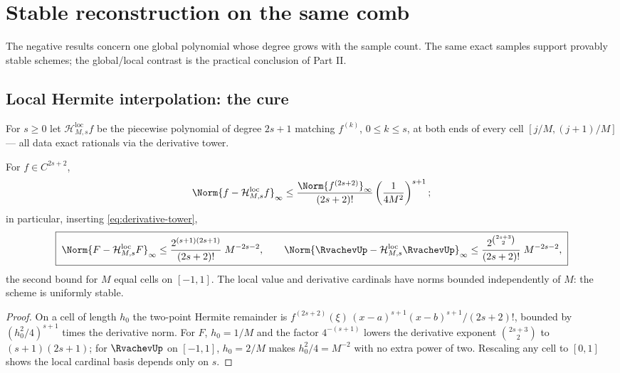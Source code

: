 \section{Stable reconstruction on the same comb}
\label{sec:alternatives}

The negative results concern one global polynomial whose degree grows
with the sample count.  The same exact samples support provably
stable schemes; the global/local contrast is the practical conclusion
of Part II.

\subsection{Local Hermite interpolation: the cure}

For $s\ge0$ let $\mathcal H^{\mathrm{loc}}_{M,s}f$ be the piecewise
polynomial of degree $2s+1$ matching $f^{(k)}$, $0\le k\le s$, at both
ends of every cell $[j/M,(j+1)/M]$ --- all data exact rationals via
the derivative tower.

\begin{theorem}
\label{thm:local-error}
For $f\in C^{2s+2}$,
\begin{equation}
 \Norm{f-\mathcal H^{\mathrm{loc}}_{M,s}f}_\infty
 \le\frac{\Norm{f^{(2s+2)}}_\infty}{(2s+2)!}
 \left(\frac{1}{4M^{2}}\right)^{s+1};
 \label{eq:local-general}
\end{equation}
in particular, inserting \eqref{eq:derivative-tower},
\begin{equation}
 \boxed{\;
 \Norm{F-\mathcal H^{\mathrm{loc}}_{M,s}F}_\infty
 \le\frac{2^{(s+1)(2s+1)}}{(2s+2)!}\;M^{-2s-2},
 \qquad
 \Norm{\RvachevUp-\mathcal H^{\mathrm{loc}}_{M,s}\RvachevUp}_\infty
 \le\frac{2^{\binom{2s+3}{2}}}{(2s+2)!}\;M^{-2s-2},
 \;}
 \label{eq:local-F-bound}
\end{equation}
the second bound for $M$ equal cells on $[-1,1]$.  The local value
and derivative cardinals have norms bounded independently of $M$: the
scheme is uniformly stable.
\end{theorem}

\begin{proof}
On a cell of length $h_0$ the two-point Hermite remainder is
$f^{(2s+2)}(\xi)\,(x-a)^{s+1}(x-b)^{s+1}/(2s+2)!$, bounded by
$(h_0^{2}/4)^{s+1}$ times the derivative norm.  For $F$, $h_0=1/M$
and the factor $4^{-(s+1)}$ lowers the derivative exponent
$\binom{2s+3}2$ to $(s+1)(2s+1)$; for $\RvachevUp$ on $[-1,1]$, $h_0=2/M$
makes $h_0^{2}/4=M^{-2}$ with no extra power of two.  Rescaling any
cell to $[0,1]$ shows the local cardinal basis depends only on $s$.
\end{proof}

